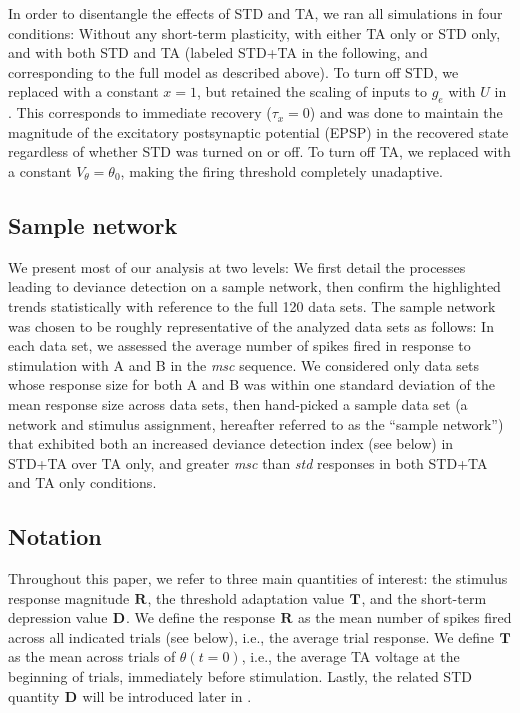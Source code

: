 \documentclass[9pt,lineno,onehalfspacing]{elife}
\newcommand{\msc}{\textit{msc}}
\newcommand{\std}{\textit{std}}
\newcommand{\R}[3][]{{}^{#1}_{}\boldsymbol R^{#2}_{#3}}
\newcommand{\T}[3][]{{}^{#1}_{}\boldsymbol T^{#2}_{#3}}
\newcommand{\D}[3][]{{}^{#1}_{}\boldsymbol D^{#2}_{#3}}
\begin{document}
In order to disentangle the effects of STD and TA, we ran all simulations in four conditions: Without any short-term plasticity, with either TA only or STD only, and with both STD and TA (labeled STD+TA in the following, and corresponding to the full model as described above). To turn off STD, we replaced  with a constant $x = 1$, but retained the scaling of inputs to $g_e$ with $U$ in . This corresponds to immediate recovery ($\tau_x = 0$) and was done to maintain the magnitude of the excitatory postsynaptic potential (EPSP) in the recovered state regardless of whether STD was turned on or off. To turn off TA, we replaced  with a constant $V_{\theta} = \theta_0$, making the firing threshold completely unadaptive.

\subsection{Sample network}\label{sec:sample}

We present most of our analysis at two levels: We first detail the processes leading to deviance detection on a sample network, then confirm the highlighted trends statistically with reference to the full 120 data sets. The sample network was chosen to be roughly representative of the analyzed data sets as follows: In each data set, we assessed the average number of spikes fired in response to stimulation with A and B in the \msc{} sequence. We considered only data sets whose response size for both A and B was within one standard deviation of the mean response size across data sets, then hand-picked a sample data set (a network and stimulus assignment, hereafter referred to as the ``sample network'') that exhibited both an increased deviance detection index (see  below) in STD+TA over TA only, and greater \msc{} than \std{} responses in both STD+TA and TA only conditions.

\subsection{Notation}\label{sec:notation}

Throughout this paper, we refer to three main quantities of interest: the stimulus response magnitude $\R{}{}$, the threshold adaptation value $\T{}{}$, and the short-term depression value $\D{}{}$. We define the response $\R{}{}$ as the mean number of spikes fired across all indicated trials (see below), i.e., the average trial response. We define $\T{}{}$ as the mean across trials of $\theta(t=0)$, i.e., the average TA voltage at the beginning of trials, immediately before stimulation. Lastly, the related STD quantity $\D{}{}$ will be introduced later in .
\end{document}
